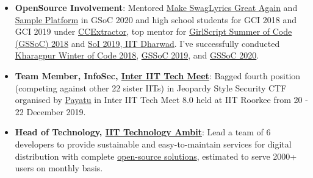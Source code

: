 \documentclass[a4paper,10pt]{extarticle} %
\begin{document}
\begin{itemize}[leftmargin=0.55cm, rightmargin=0.2cm, label={\Large\textbullet}]

\item \textbf{OpenSource Involvement}: Mentored \href{https://summerofcode.withgoogle.com/projects/#6058060717490176}{Make SwagLyrics Great Again} and \href{https://summerofcode.withgoogle.com/projects/#6707916582682624}{Sample Platform} in GSoC 2020 and  high school students for GCI 2018 and GCI 2019 under \href{https://codein.withgoogle.com/organizations/ccextractor-development/}{CCExtractor}, top mentor for \href{https://www.gssoc.tech/}{GirlScript Summer of Code (GSSoC) 2018} and \href{https://oss2019.github.io/SoI.html}{SoI 2019, IIT Dharwad}. I've successfully conducted
\href{https://kwoc.kossiitkgp.org/}{Kharagpur Winter of Code 2018}, \href{https://gssoc.tech/}{GSSoC 2019}, and \href{https://gssoc.tech/}{GSSoC 2020}.

\item\textbf{Team Member, InfoSec, \href{https://wiki.metakgp.org/w/Inter_IIT_Tech_Meet}{Inter IIT Tech Meet}}: Bagged fourth position (competing against other 22 sister IITs) in Jeopardy Style Security CTF organised by \href{https://payatu.com/}{Payatu} in Inter IIT Tech Meet 8.0 held at IIT Roorkee from 20 - 22 December 2019.

\item\textbf{Head of Technology, {\href{https://iit-techambit.in}{IIT Technology Ambit}}}: Lead a team of 6 developers to provide sustainable and easy-to-maintain services for digital distribution with complete {\href{https://github.com/iit-technology-ambit/}{open-source solutions}}, estimated to serve 2000+ users on monthly basis.




\end{itemize}
\end{document}
